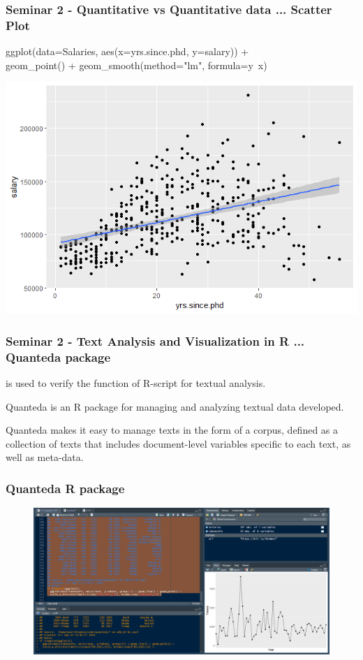 \documentclass{beamer}
\begin{document}
\begin{frame}
\frametitle{Seminar 2 - Quantitative vs Quantitative data ... Scatter Plot}

\begin{example} 

ggplot(data=Salaries, aes(x=yrs.since.phd, y=salary)) +\\ 
  geom\_point() + \newline
  geom\_smooth(method="lm", formula=y~x)
 
\end{example}
 \includegraphics[width=0.6\linewidth]{Seminar_2_images/R/b scatterplot.png}
\end{frame}
\begin{frame}
\frametitle{Seminar 2 - Text Analysis and Visualization in R ... Quanteda package}
\cite{Benoit2021} is used to verify the function of R-script for textual analysis.\newline

Quanteda is an R package for managing and analyzing textual data developed.\newline

Quanteda makes it easy to manage texts in the form of a corpus, defined as a collection of texts that includes document-level variables specific to each text, as well as meta-data.\newline


\end{frame}
\begin{frame}
\frametitle{Quanteda R package}
\begin{figure}
\includegraphics[width=1\linewidth]{Seminar_2_images/R/b quan.png}
\end{figure}
\end{frame}
\end{document}
